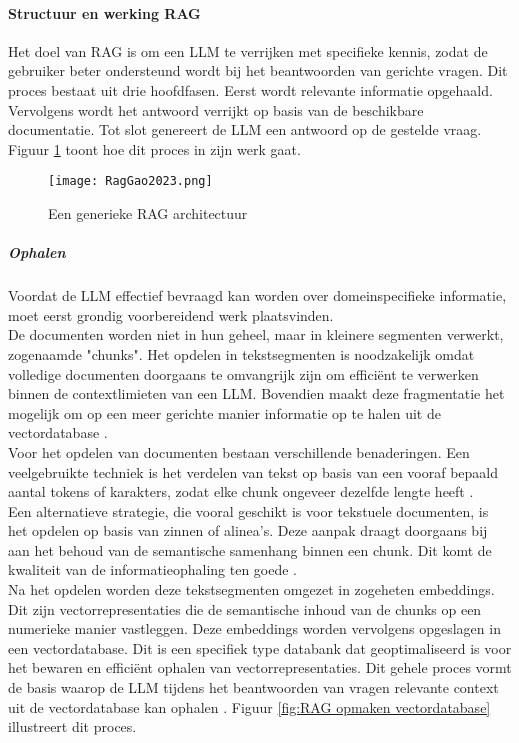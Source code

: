 \paragraph{Structuur en werking RAG}

Het doel van RAG is om een LLM te verrijken met specifieke kennis, zodat de gebruiker beter ondersteund wordt bij het beantwoorden van gerichte vragen. Dit proces bestaat uit drie hoofdfasen. Eerst wordt relevante informatie opgehaald. Vervolgens wordt het antwoord verrijkt op basis van de beschikbare documentatie. Tot slot genereert de LLM een antwoord op de gestelde vraag. Figuur \ref{fig:Rag process} toont hoe dit proces in zijn werk gaat.

\begin{figure}[H]
    \centering
    \texttt{[image: RagGao2023.png]}
    \caption{Een generieke RAG architectuur \autocite{gao2024retrievalaugmentedgenerationlargelanguage}}
    \label{fig:Rag process}
\end{figure}

\subparagraph{Ophalen}
Voordat de LLM effectief bevraagd kan worden over domeinspecifieke informatie, moet eerst grondig voorbereidend werk plaatsvinden. 
\\[1em]
De documenten worden niet in hun geheel, maar in kleinere segmenten verwerkt, zogenaamde "chunks". Het opdelen in tekstsegmenten is noodzakelijk omdat volledige documenten doorgaans te omvangrijk zijn om efficiënt te verwerken binnen de contextlimieten van een LLM. Bovendien maakt deze fragmentatie het mogelijk om op een meer gerichte manier informatie op te halen uit de vectordatabase \autocite{wu2025retrievalaugmentedgenerationnaturallanguage}.
\\[1em]
Voor het opdelen van documenten bestaan verschillende benaderingen. Een veelgebruikte techniek is het verdelen van tekst op basis van een vooraf bepaald aantal tokens of karakters, zodat elke chunk ongeveer dezelfde lengte heeft \autocite{wang2024searchingbestpracticesretrievalaugmented}.
\\[1em]
Een alternatieve strategie, die vooral geschikt is voor tekstuele documenten, is het opdelen op basis van zinnen of alinea's. Deze aanpak draagt doorgaans bij aan het behoud van de semantische samenhang binnen een chunk. Dit komt de kwaliteit van de informatieophaling ten goede \autocite{wang2024searchingbestpracticesretrievalaugmented}.
\\[1em]
Na het opdelen worden deze tekstsegmenten omgezet in zogeheten embeddings. Dit zijn vectorrepresentaties die de semantische inhoud van de chunks op een numerieke manier vastleggen. Deze embeddings worden vervolgens opgeslagen in een vectordatabase. Dit is een specifiek type databank dat geoptimaliseerd is voor het bewaren en efficiënt ophalen van vectorrepresentaties. Dit gehele proces vormt de basis waarop de LLM tijdens het beantwoorden van vragen relevante context uit de vectordatabase kan ophalen \autocite{wu2025retrievalaugmentedgenerationnaturallanguage}. Figuur \ref{fig:RAG opmaken vectordatabase} illustreert dit proces.


